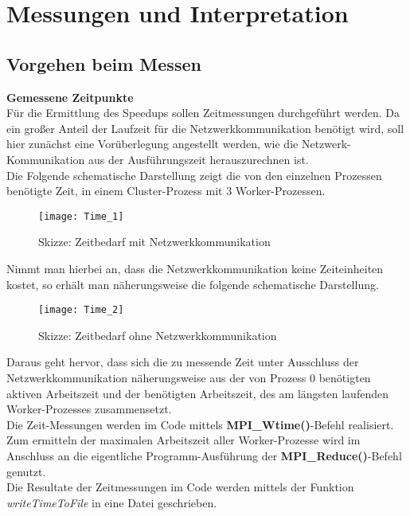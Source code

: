 \documentclass[
10pt, %
a4paper, %
oneside, %
headinclude,footinclude, %
BCOR5mm, %
]{scrartcl}
\begin{document}
\section{Messungen und Interpretation}
\subsection{Vorgehen beim Messen}

\textbf{Gemessene Zeitpunkte}\\
Für die Ermittlung des Speedups sollen Zeitmessungen durchgeführt werden. Da ein großer Anteil der Laufzeit für die Netzwerkkommunikation benötigt wird, soll hier zunächst eine Vorüberlegung angestellt werden, wie die Netzwerk-Kommunikation aus der Ausführungszeit herauszurechnen ist. \\Die Folgende schematische Darstellung zeigt die von den einzelnen Prozessen benötigte Zeit, in einem Cluster-Prozess mit 3 Worker-Prozessen.

\begin{figure}[h]
	\centering 
	\texttt{[image: Time\_1]} 
	\caption[Skizze: Zeitbedarf mit Netzwerkkommunikation]{Skizze: Zeitbedarf mit Netzwerkkommunikation }
	
\end{figure}

Nimmt man hierbei an, dass die Netzwerkkommunikation keine Zeiteinheiten kostet, so erhält man näherungsweise die folgende schematische Darstellung.

\begin{figure}[h]
	\centering 
	\texttt{[image: Time\_2]} 
	\caption[Skizze: Zeitbedarf ohne Netzwerkkommunikation]{Skizze: Zeitbedarf ohne Netzwerkkommunikation}
	
\end{figure}

Daraus geht hervor, dass sich die zu messende Zeit unter Ausschluss der Netzwerkkommunikation näherungsweise aus der von Prozess 0 benötigten aktiven Arbeitszeit und der benötigten Arbeitszeit, des am längsten laufenden Worker-Prozesses zusammensetzt.\\
Die Zeit-Messungen werden im Code mittels \textbf{MPI\_Wtime()}-Befehl realisiert. Zum ermitteln der maximalen Arbeitszeit aller Worker-Prozesse wird im Anschluss an die eigentliche Programm-Ausführung der \textbf{MPI\_Reduce()}-Befehl genutzt.\\
Die Resultate der Zeitmessungen im Code werden mittels der Funktion \textit{writeTimeToFile} in eine Datei geschrieben.\\
\end{document}
